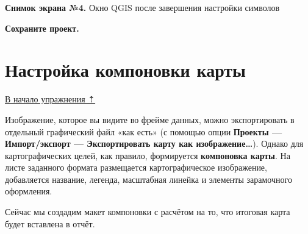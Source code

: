 \documentclass[
  12pt,
]{book}
\begin{document}
\textbf{Снимок экрана №4.} Окно QGIS после завершения настройки символов

\textbf{Сохраните проект.}

\hypertarget{map-design-general-layout}{%
\section{Настройка компоновки карты}\label{map-design-general-layout}}

\protect\hyperlink{map-design-general}{В начало упражнения ⇡}

Изображение, которое вы видите во фрейме данных, можно экспортировать в отдельный графический файл «как есть» (с помощью опции \textbf{Проекты --- Импорт/экспорт --- Экспортировать карту как изображение\ldots{}}). Однако для картографических целей, как правило, формируется \textbf{компоновка карты}. На листе заданного формата размещается картографическое изображение, добавляется название, легенда, масштабная линейка и элементы зарамочного оформления.

Сейчас мы создадим макет компоновки с расчётом на то, что итоговая карта будет вставлена в отчёт.
\end{document}
